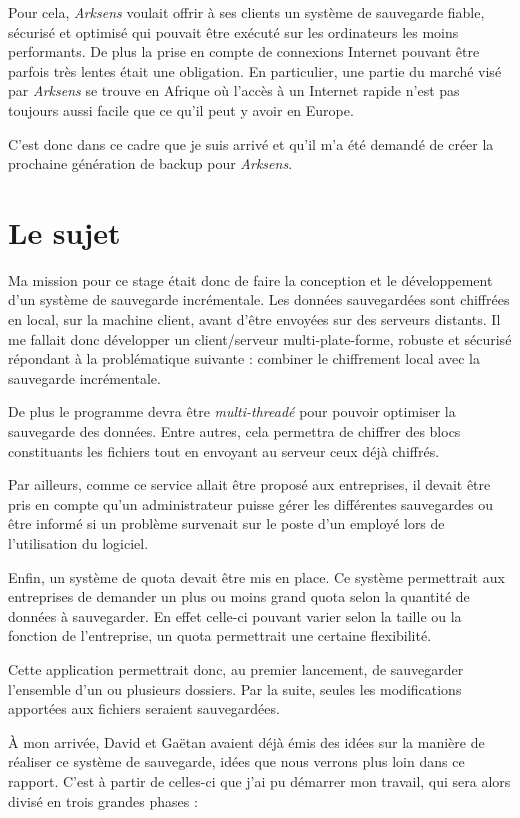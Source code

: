 \documentclass[a4paper,10pt, twoside]{report}
\begin{document}
\begin{spacing}{1.2}
Pour cela, \textit{Arksens} voulait offrir à ses clients un système de
sauvegarde fiable, sécurisé et optimisé qui pouvait être
exécuté sur les ordinateurs les moins performants. De plus la prise en
compte de connexions Internet pouvant être parfois très lentes était une
obligation. En particulier, une partie du marché visé par \textit{Arksens}
se trouve en Afrique où l'accès à un Internet rapide n'est pas toujours
aussi facile que ce qu'il peut y avoir en Europe.

C'est donc dans ce cadre que je suis arrivé et qu'il m'a été demandé
de créer la prochaine génération de backup pour \textit{Arksens}.

\section{Le sujet}

Ma mission pour ce stage était donc de faire la conception et le
développement d'un système de sauvegarde incrémentale. Les données
sauvegardées sont chiffrées en local, sur la machine client, avant d'être
envoyées sur des serveurs distants. Il me fallait donc développer un
client/serveur multi-plate-forme, robuste et sécurisé répondant à
la problématique suivante : combiner le chiffrement local avec la sauvegarde
incrémentale.

De plus le programme devra être \textit{multi-threadé} pour pouvoir
optimiser la sauvegarde des données. Entre autres, cela permettra de chiffrer
des blocs constituants les fichiers tout en envoyant au serveur ceux déjà
chiffrés.

Par ailleurs, comme ce service allait être proposé aux entreprises, il devait
être pris en compte qu'un administrateur puisse gérer les différentes
sauvegardes ou être informé si un problème survenait sur le poste d'un employé
lors de l'utilisation du logiciel.

Enfin, un système de quota devait être mis en place. Ce système permettrait
aux entreprises de demander un plus ou moins grand quota selon la quantité de
données à sauvegarder. En effet celle-ci pouvant varier selon la taille ou la
fonction de l'entreprise, un quota permettrait une certaine flexibilité.

Cette application permettrait donc, au premier lancement, de sauvegarder
l'ensemble d'un ou plusieurs dossiers. Par la suite, seules les modifications
apportées aux fichiers seraient sauvegardées.

À mon arrivée, David et Gaëtan avaient déjà émis des idées sur la
manière de réaliser ce système de sauvegarde, idées que nous verrons
plus loin dans ce rapport. C'est à partir de celles-ci que j'ai pu
démarrer mon travail, qui sera alors divisé en trois grandes phases :


\end{spacing}
\end{document}
